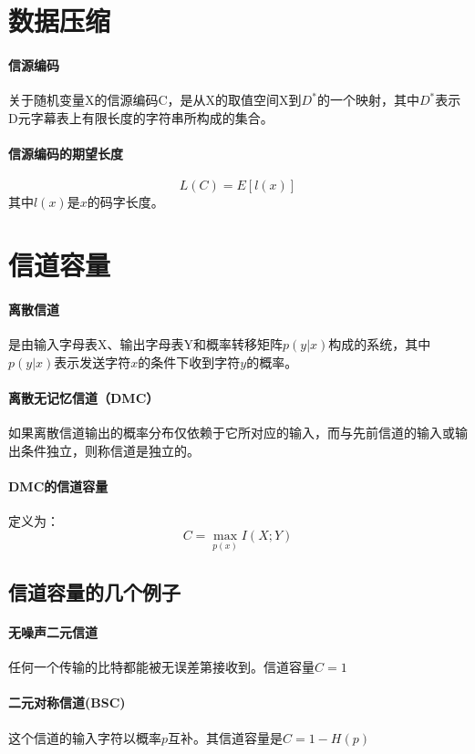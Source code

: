 \documentclass[10pt,letterpaper]{article}
\begin{document}
\section{数据压缩}
\paragraph{信源编码} 关于随机变量X的信源编码C，是从X的取值空间X到$D^*$的一个映射，其中$D^*$表示D元字幕表上有限长度的字符串所构成的集合。
\paragraph{信源编码的期望长度}
\begin{equation}
	L(C) = E[l(x)]
\end{equation}
其中$l(x)$是$x$的码字长度。

\section{信道容量}
\paragraph{离散信道} 是由输入字母表X、输出字母表Y和概率转移矩阵$p(y|x)$构成的系统，其中$p(y|x)$表示发送字符$x$的条件下收到字符$y$的概率。
\paragraph{离散无记忆信道（DMC）} 如果离散信道输出的概率分布仅依赖于它所对应的输入，而与先前信道的输入或输出条件独立，则称信道是独立的。
\paragraph{DMC的信道容量} 定义为：
\begin{equation}
	C = \max_{p(x)}I(X;Y)
\end{equation}

\subsection{信道容量的几个例子}
\paragraph{无噪声二元信道} 任何一个传输的比特都能被无误差第接收到。信道容量$C=1$
\paragraph{二元对称信道(BSC)} 这个信道的输入字符以概率$p$互补。其信道容量是$C=1-H(p)$
\end{document}
